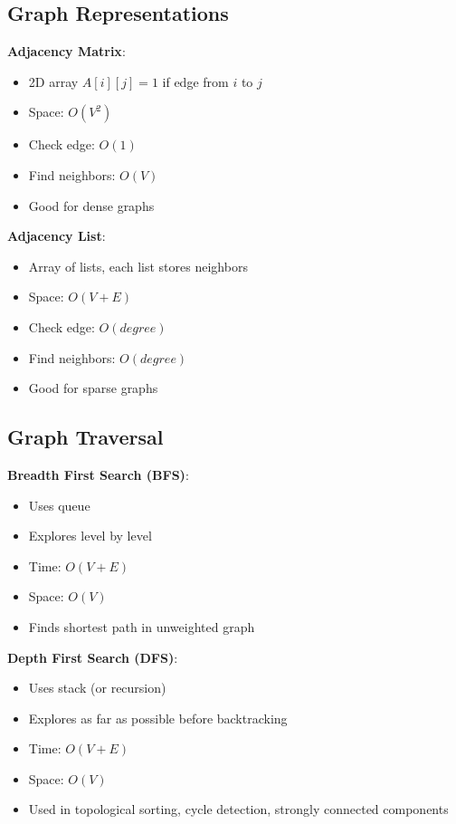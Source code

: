 \documentclass[12pt,a4paper]{report}
\begin{document}
\subsection{Graph Representations}
\begin{concept}
\textbf{Adjacency Matrix}:
\begin{itemize}
    \item 2D array $A[i][j] = 1$ if edge from $i$ to $j$
    \item Space: $O(V^2)$
    \item Check edge: $O(1)$
    \item Find neighbors: $O(V)$
    \item Good for dense graphs
\end{itemize}

\textbf{Adjacency List}:
\begin{itemize}
    \item Array of lists, each list stores neighbors
    \item Space: $O(V + E)$
    \item Check edge: $O(degree)$
    \item Find neighbors: $O(degree)$
    \item Good for sparse graphs
\end{itemize}
\end{concept}

\subsection{Graph Traversal}
\begin{concept}
\textbf{Breadth First Search (BFS)}:
\begin{itemize}
    \item Uses queue
    \item Explores level by level
    \item Time: $O(V + E)$
    \item Space: $O(V)$
    \item Finds shortest path in unweighted graph
\end{itemize}

\textbf{Depth First Search (DFS)}:
\begin{itemize}
    \item Uses stack (or recursion)
    \item Explores as far as possible before backtracking
    \item Time: $O(V + E)$
    \item Space: $O(V)$
    \item Used in topological sorting, cycle detection, strongly connected components
\end{itemize}
\end{concept}
\end{document}
